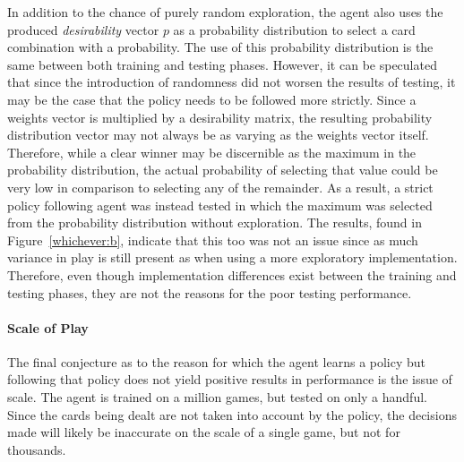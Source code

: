 In addition to the chance of purely random exploration,
the agent also uses the produced \textit{desirability} vector $p$
as a probability distribution to select a card combination with a probability.
%
The use of this probability distribution is the same between both training 
and testing phases.
%
However,
it can be speculated that since the introduction of randomness did not worsen
the results of testing,
it may be the case that the policy needs to be followed more strictly.
%
Since a weights vector is multiplied by a desirability matrix,
the resulting probability distribution vector may not always be as
varying as the weights vector itself.
%
Therefore,
while a clear winner may be discernible as the maximum in the probability
distribution,
the actual probability of selecting that value could be very low in comparison
to selecting any of the remainder.
%
As a result,
a strict policy following agent was instead tested in which the maximum was
selected from the probability distribution without exploration.
%
The results,
found in Figure~\ref{whichever:b},
indicate that this too was not an issue
since as much variance in play is still present as when using a more exploratory
implementation.
%
Therefore,
even though implementation differences exist between the training and testing
phases,
they are not the reasons for the poor testing performance.


\paragraph{Scale of Play}

The final conjecture as to the reason for which the agent learns a policy
but following that policy does not yield positive results in performance
is the issue of scale.
%
The agent is trained on a million games,
but tested on only a handful.
%
Since the cards being dealt are not taken into account by the policy,
the decisions made will likely be inaccurate on the scale of a single game,
but not for thousands.




